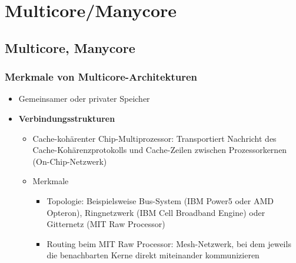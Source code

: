 \section{Multicore/Manycore}

\subsection{Multicore, Manycore}

\subsubsection{Merkmale von Multicore-Architekturen}
\begin{itemize}
	\item Gemeinsamer oder privater Speicher
	\item \textbf{Verbindungsstrukturen}
	\begin{itemize}
		\item Cache-kohärenter Chip-Multiprozessor: Transportiert Nachricht des Cache-Kohärenzprotokolls und Cache-Zeilen zwischen Prozessorkernen (On-Chip-Netzwerk)
		\item Merkmale
		\begin{itemize}
			\item Topologie: Beispielsweise Bus-System (IBM Power5 oder AMD Opteron), Ringnetzwerk (IBM Cell Broadband Engine) oder Gitternetz (MIT Raw Processor)
			\item Routing beim MIT Raw Processor: Mesh-Netzwerk, bei dem jeweils die benachbarten Kerne direkt miteinander kommunizieren
		\end{itemize}
	\end{itemize}
\end{itemize}

